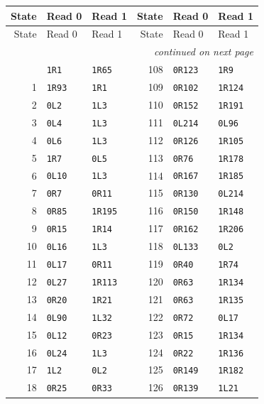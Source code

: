 \begingroup\small
\begin{longtable}{rll@{\hspace{2em}}rll}
\toprule State & Read 0 & Read 1 & State & Read 0 & Read 1\\\midrule
\endfirsthead
\toprule State & Read 0 & Read 1 & State & Read 0 & Read 1\\\midrule
\endhead
\midrule\multicolumn{6}{r}{\emph{continued on next page}}\\\endfoot
\bottomrule\endlastfoot
0 & \texttt{1R1} & \texttt{1R65} & 108 & \texttt{0R123} & \texttt{1R9}\\
1 & \texttt{1R93} & \texttt{1R1} & 109 & \texttt{0R102} & \texttt{1R124}\\
2 & \texttt{0L2} & \texttt{1L3} & 110 & \texttt{0R152} & \texttt{1R191}\\
3 & \texttt{0L4} & \texttt{1L3} & 111 & \texttt{0L214} & \texttt{0L96}\\
4 & \texttt{0L6} & \texttt{1L3} & 112 & \texttt{0R126} & \texttt{1R105}\\
5 & \texttt{1R7} & \texttt{0L5} & 113 & \texttt{0R76} & \texttt{1R178}\\
6 & \texttt{0L10} & \texttt{1L3} & 114 & \texttt{0R167} & \texttt{1R185}\\
7 & \texttt{0R7} & \texttt{0R11} & 115 & \texttt{0R130} & \texttt{0L214}\\
8 & \texttt{0R85} & \texttt{1R195} & 116 & \texttt{0R150} & \texttt{1R148}\\
9 & \texttt{0R15} & \texttt{1R14} & 117 & \texttt{0R162} & \texttt{1R206}\\
10 & \texttt{0L16} & \texttt{1L3} & 118 & \texttt{0L133} & \texttt{0L2}\\
11 & \texttt{0L17} & \texttt{0R11} & 119 & \texttt{0R40} & \texttt{1R74}\\
12 & \texttt{0L27} & \texttt{1R113} & 120 & \texttt{0R63} & \texttt{1R134}\\
13 & \texttt{0R20} & \texttt{1R21} & 121 & \texttt{0R63} & \texttt{1R135}\\
14 & \texttt{0L90} & \texttt{1L32} & 122 & \texttt{0R72} & \texttt{0L17}\\
15 & \texttt{0L12} & \texttt{0R23} & 123 & \texttt{0R15} & \texttt{1R134}\\
16 & \texttt{0L24} & \texttt{1L3} & 124 & \texttt{0R22} & \texttt{1R136}\\
17 & \texttt{1L2} & \texttt{0L2} & 125 & \texttt{0R149} & \texttt{1R182}\\
18 & \texttt{0R25} & \texttt{0R33} & 126 & \texttt{0R139} & \texttt{1L21}\\

\end{longtable}
